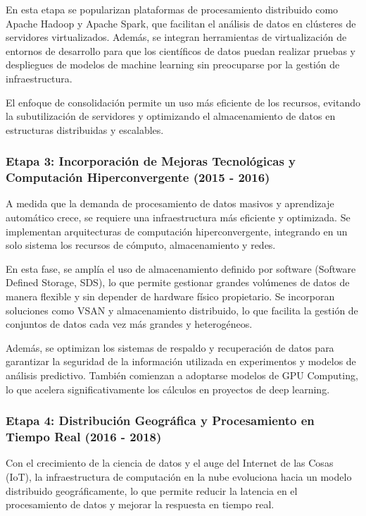 {                En esta etapa se popularizan plataformas de procesamiento distribuido como Apache Hadoop y Apache Spark, que facilitan el an{\'a}lisis de datos en cl{\'u}steres de servidores virtualizados. Adem{\'a}s, se integran herramientas de virtualizaci{\'o}n de entornos de desarrollo para que los cient{\'i}ficos de datos puedan realizar pruebas y despliegues de modelos de machine learning sin preocuparse por la gesti{\'o}n de infraestructura.
            
                El enfoque de consolidaci{\'o}n permite un uso m{\'a}s eficiente de los recursos, evitando la subutilizaci{\'o}n de servidores y optimizando el almacenamiento de datos en estructuras distribuidas y escalables.
            
            \subsubsection{Etapa 3: Incorporaci{\'o}n de Mejoras Tecnol{\'o}gicas y Computaci{\'o}n Hiperconvergente (2015 - 2016)}
                A medida que la demanda de procesamiento de datos masivos y aprendizaje autom{\'a}tico crece, se requiere una infraestructura m{\'a}s eficiente y optimizada. Se implementan arquitecturas de computaci{\'o}n hiperconvergente, integrando en un solo sistema los recursos de c{\'o}mputo, almacenamiento y redes.
            
                En esta fase, se ampl{\'i}a el uso de almacenamiento definido por software (Software Defined Storage, SDS), lo que permite gestionar grandes vol{\'u}menes de datos de manera flexible y sin depender de hardware f{\'i}sico propietario. Se incorporan soluciones como VSAN y almacenamiento distribuido, lo que facilita la gesti{\'o}n de conjuntos de datos cada vez m{\'a}s grandes y heterog{\'e}neos.
            
                Adem{\'a}s, se optimizan los sistemas de respaldo y recuperaci{\'o}n de datos para garantizar la seguridad de la informaci{\'o}n utilizada en experimentos y modelos de an{\'a}lisis predictivo. Tambi{\'e}n comienzan a adoptarse modelos de GPU Computing, lo que acelera significativamente los c{\'a}lculos en proyectos de deep learning.
            
            \subsubsection{Etapa 4: Distribuci{\'o}n Geogr{\'a}fica y Procesamiento en Tiempo Real (2016 - 2018)}
                Con el crecimiento de la ciencia de datos y el auge del Internet de las Cosas (IoT), la infraestructura de computaci{\'o}n en la nube evoluciona hacia un modelo distribuido geogr{\'a}ficamente, lo que permite reducir la latencia en el procesamiento de datos y mejorar la respuesta en tiempo real.
            
}
